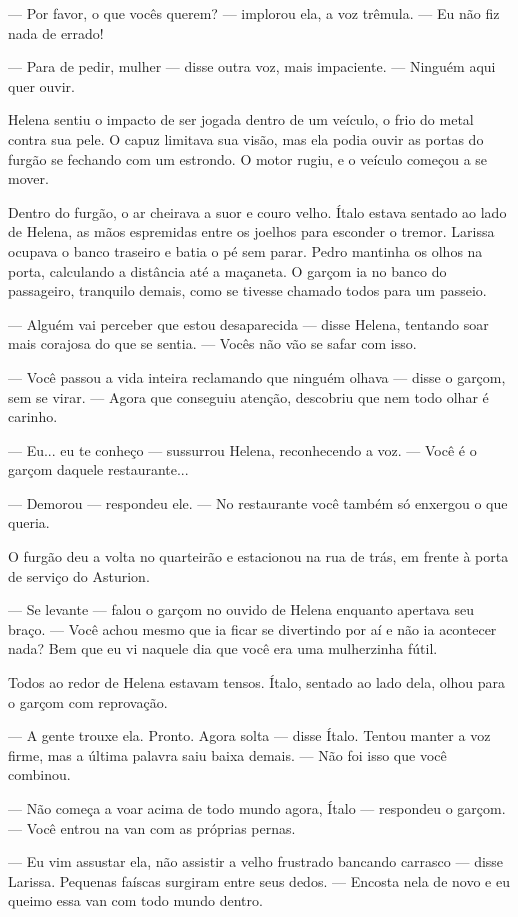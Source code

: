 — Por favor, o que vocês querem? — implorou ela, a voz trêmula. — Eu não fiz nada de errado!

— Para de pedir, mulher — disse outra voz, mais impaciente. — Ninguém aqui quer ouvir.

Helena sentiu o impacto de ser jogada dentro de um veículo, o frio do metal contra sua pele. O capuz limitava sua visão, mas ela podia ouvir as portas do furgão se fechando com um estrondo. O motor rugiu, e o veículo começou a se mover.

Dentro do furgão, o ar cheirava a suor e couro velho. Ítalo estava sentado ao lado de Helena, as mãos espremidas entre os joelhos para esconder o tremor. Larissa ocupava o banco traseiro e batia o pé sem parar. Pedro mantinha os olhos na porta, calculando a distância até a maçaneta. O garçom ia no banco do passageiro, tranquilo demais, como se tivesse chamado todos para um passeio.

— Alguém vai perceber que estou desaparecida — disse Helena, tentando soar mais corajosa do que se sentia. — Vocês não vão se safar com isso.

— Você passou a vida inteira reclamando que ninguém olhava — disse o garçom, sem se virar. — Agora que conseguiu atenção, descobriu que nem todo olhar é carinho.

— Eu... eu te conheço — sussurrou Helena, reconhecendo a voz. — Você é o garçom daquele restaurante...

— Demorou — respondeu ele. — No restaurante você também só enxergou o que queria.

O furgão deu a volta no quarteirão e estacionou na rua de trás, em frente à porta de serviço do Asturion.

— Se levante — falou o garçom no ouvido de Helena enquanto apertava seu braço. — Você achou mesmo que ia ficar se divertindo por aí e não ia acontecer nada? Bem que eu vi naquele dia que você era uma mulherzinha fútil.

Todos ao redor de Helena estavam tensos. Ítalo, sentado ao lado dela, olhou para o garçom com reprovação.

— A gente trouxe ela. Pronto. Agora solta — disse Ítalo. Tentou manter a voz firme, mas a última palavra saiu baixa demais. — Não foi isso que você combinou.

— Não começa a voar acima de todo mundo agora, Ítalo — respondeu o garçom. — Você entrou na van com as próprias pernas.

— Eu vim assustar ela, não assistir a velho frustrado bancando carrasco — disse Larissa. Pequenas faíscas surgiram entre seus dedos. — Encosta nela de novo e eu queimo essa van com todo mundo dentro.

